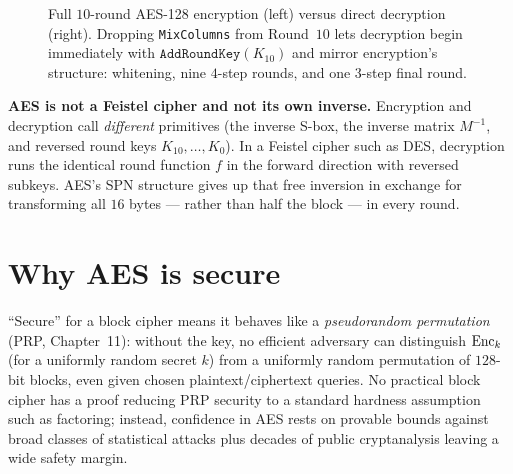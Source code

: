 \begin{figure}[htbp]
\caption{Full $10$-round AES-128 encryption (left) versus direct decryption (right). Dropping \texttt{MixColumns} from Round~$10$ lets decryption begin immediately with $\texttt{AddRoundKey}(K_{10})$ and mirror encryption's structure: whitening, nine $4$-step rounds, and one $3$-step final round.}
\label{ch12:fig-enc-dec}
\end{figure}

\begin{focusbox}
\textbf{AES is not a Feistel cipher and not its own inverse.} Encryption and
decryption call \emph{different} primitives (the inverse S-box, the inverse matrix
$M^{-1}$, and reversed round keys $K_{10},\dots,K_0$). In a Feistel cipher such as
DES, decryption runs the identical round function $f$ in the forward direction with
reversed subkeys. AES's SPN structure gives up that free inversion in exchange for
transforming all $16$ bytes --- rather than half the block --- in every round.
\end{focusbox}

\section{Why AES is secure}
\label{ch12:security}

``Secure'' for a block cipher means it behaves like a \emph{pseudorandom
permutation} (PRP, Chapter~11): without the key, no efficient adversary can
distinguish $\operatorname{Enc}_k$ (for a uniformly random secret $k$) from a uniformly random
permutation of $128$-bit blocks, even given chosen plaintext/ciphertext queries.
No practical block cipher has a proof reducing PRP security to a standard hardness
assumption such as factoring; instead, confidence in AES rests on provable bounds
against broad classes of statistical attacks plus decades of public cryptanalysis
leaving a wide safety margin.

